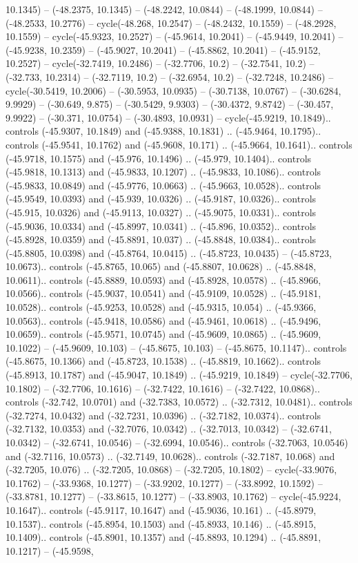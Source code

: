 \begin{scope}[shift={(2.5552, 9.9912)}]
\begin{scope}[shift={(48.1654, -14.8546)}]
10.1345) -- (-48.2375, 10.1345) -- (-48.2242, 10.0844) -- (-48.1999, 10.0844) -- (-48.2533, 10.2776) -- cycle(-48.268, 10.2547) -- (-48.2432, 10.1559) -- (-48.2928, 10.1559) -- cycle(-45.9323, 10.2527) -- (-45.9614, 10.2041) -- (-45.9449, 10.2041) -- (-45.9238, 10.2359) -- (-45.9027, 10.2041) -- (-45.8862, 10.2041) -- (-45.9152, 10.2527) -- cycle(-32.7419, 10.2486) -- (-32.7706, 10.2) -- (-32.7541, 10.2) -- (-32.733, 10.2314) -- (-32.7119, 10.2) -- (-32.6954, 10.2) -- (-32.7248, 10.2486) -- cycle(-30.5419, 10.2006) -- (-30.5953, 10.0935) -- (-30.7138, 10.0767) -- (-30.6284, 9.9929) -- (-30.649, 9.875) -- (-30.5429, 9.9303) -- (-30.4372, 9.8742) -- (-30.457, 9.9922) -- (-30.371, 10.0754) -- (-30.4893, 10.0931) -- cycle(-45.9219, 10.1849).. controls (-45.9307, 10.1849) and (-45.9388, 10.1831) .. (-45.9464, 10.1795).. controls (-45.9541, 10.1762) and (-45.9608, 10.171) .. (-45.9664, 10.1641).. controls (-45.9718, 10.1575) and (-45.976, 10.1496) .. (-45.979, 10.1404).. controls (-45.9818, 10.1313) and (-45.9833, 10.1207) .. (-45.9833, 10.1086).. controls (-45.9833, 10.0849) and (-45.9776, 10.0663) .. (-45.9663, 10.0528).. controls (-45.9549, 10.0393) and (-45.939, 10.0326) .. (-45.9187, 10.0326).. controls (-45.915, 10.0326) and (-45.9113, 10.0327) .. (-45.9075, 10.0331).. controls (-45.9036, 10.0334) and (-45.8997, 10.0341) .. (-45.896, 10.0352).. controls (-45.8928, 10.0359) and (-45.8891, 10.037) .. (-45.8848, 10.0384).. controls (-45.8805, 10.0398) and (-45.8764, 10.0415) .. (-45.8723, 10.0435) -- (-45.8723, 10.0673).. controls (-45.8765, 10.065) and (-45.8807, 10.0628) .. (-45.8848, 10.0611).. controls (-45.8889, 10.0593) and (-45.8928, 10.0578) .. (-45.8966, 10.0566).. controls (-45.9037, 10.0541) and (-45.9109, 10.0528) .. (-45.9181, 10.0528).. controls (-45.9253, 10.0528) and (-45.9315, 10.054) .. (-45.9366, 10.0563).. controls (-45.9418, 10.0586) and (-45.9461, 10.0618) .. (-45.9496, 10.0659).. controls (-45.9571, 10.0745) and (-45.9609, 10.0865) .. (-45.9609, 10.1022) -- (-45.9609, 10.103) -- (-45.8675, 10.103) -- (-45.8675, 10.1147).. controls (-45.8675, 10.1366) and (-45.8723, 10.1538) .. (-45.8819, 10.1662).. controls (-45.8913, 10.1787) and (-45.9047, 10.1849) .. (-45.9219, 10.1849) -- cycle(-32.7706, 10.1802) -- (-32.7706, 10.1616) -- (-32.7422, 10.1616) -- (-32.7422, 10.0868).. controls (-32.742, 10.0701) and (-32.7383, 10.0572) .. (-32.7312, 10.0481).. controls (-32.7274, 10.0432) and (-32.7231, 10.0396) .. (-32.7182, 10.0374).. controls (-32.7132, 10.0353) and (-32.7076, 10.0342) .. (-32.7013, 10.0342) -- (-32.6741, 10.0342) -- (-32.6741, 10.0546) -- (-32.6994, 10.0546).. controls (-32.7063, 10.0546) and (-32.7116, 10.0573) .. (-32.7149, 10.0628).. controls (-32.7187, 10.068) and (-32.7205, 10.076) .. (-32.7205, 10.0868) -- (-32.7205, 10.1802) -- cycle(-33.9076, 10.1762) -- (-33.9368, 10.1277) -- (-33.9202, 10.1277) -- (-33.8992, 10.1592) -- (-33.8781, 10.1277) -- (-33.8615, 10.1277) -- (-33.8903, 10.1762) -- cycle(-45.9224, 10.1647).. controls (-45.9117, 10.1647) and (-45.9036, 10.161) .. (-45.8979, 10.1537).. controls (-45.8954, 10.1503) and (-45.8933, 10.146) .. (-45.8915, 10.1409).. controls (-45.8901, 10.1357) and (-45.8893, 10.1294) .. (-45.8891, 10.1217) -- (-45.9598, 
\end{scope}
\end{scope}

